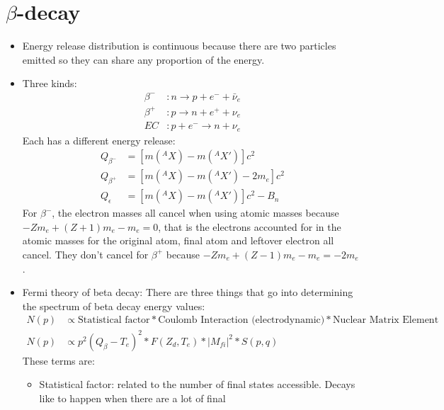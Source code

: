 \documentclass[letter]{article}
\begin{document}
\section*{$\beta$-decay}
\begin{itemize}
\item Energy release distribution is continuous because there are two
  particles emitted so they can share any proportion of the
  energy.~\cite[pp. 273, Lec 19]{krane,lecture}
\item Three kinds:
  \begin{equation*}
    \begin{split}
    \beta^-&: n \to p + e^- + \bar{\nu}_e \\
    \beta^+&: p \to n + e^+ + \nu_e \\
    EC&: p + e^- \to n + \nu_e
  \end{split}
  \end{equation*}
Each has a different energy release:
\begin{equation*}
  \begin{split}
    Q_{\beta^-}&=[m(^AX)-m(^AX')]c^2 \\
    Q_{\beta^+}&=[m(^AX)-m(^AX')-2m_e]c^2\\
    Q_{\epsilon}&=[m(^AX)-m(^AX')]c^2-B_n
  \end{split}
\end{equation*}
For $\beta^-$, the electron masses all cancel when using atomic masses
because $-Zm_e+(Z+1)m_e-m_e=0$, that is the electrons accounted for in
the atomic masses for the original atom, final atom and leftover
electron all cancel. They don't cancel for $\beta^+$ because
$-Zm_e+(Z-1)m_e-m_e=-2m_e$.~\cite[pp. 274-276]{krane}
\item Fermi theory of beta decay: There are three things that go into
  determining the spectrum of beta decay energy values:
  \begin{equation*}
    \begin{split}
    N(p) &\propto \text{Statistical factor} * \text{Coulomb Interaction
    (electrodynamic)} * \text{Nuclear Matrix Element} \\
  N(p) &\propto p^2(Q_\beta-T_e)^2*F(Z_d,T_e)*|M_{fi}|^2*S(p,q)
\end{split}
\end{equation*}
These terms are:
\begin{itemize}
\item Statistical factor: related to the number of final states
  accessible. Decays like to happen when there are a lot of final

\end{itemize}
\end{itemize}
\end{document}
